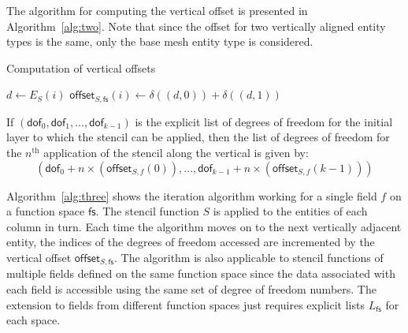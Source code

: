\documentclass[11pt, a4paper]{scrartcl}
\begin{document}
The algorithm for computing the vertical offset is presented in
Algorithm~\ref{alg:two}. Note that since the offset for two vertically
aligned entity types is the same, only the base mesh entity type is
considered.
\begin{algorithm}[th]
\caption{Computation of vertical offsets}
\label{alg:two}
\begin{algorithmic}

	\STATE $d \leftarrow E_{S}(i)$
	\STATE $\mathsf{offset}_{S, \mathsf{fs}}(i) \leftarrow \delta((d, 0)) + \delta((d, 1))$
\ENDFOR
\end{algorithmic}
\end{algorithm}

If $(\mathsf{dof}_{0}, \mathsf{dof}_{1}, ... , \mathsf{dof}_{k-1})$ is
the explicit list of degrees of freedom for the initial layer to which
the stencil can be applied, then the list of degrees of freedom for
the $n^\mathrm{th}$ application of the stencil along the vertical is
given by:
\begin{equation}
(\mathsf{dof}_{0} + n \times (\mathsf{offset}_{S, f}(0)) , ... , \mathsf{dof}_{k-1} + n \times (\mathsf{offset}_{S, f}(k-1)))
\end{equation}

Algorithm~\ref{alg:three} shows the iteration algorithm working for a
single field $f$ on a function space $\mathsf{fs}$. The stencil
function $S$ is applied to the entities of each column in turn. Each
time the algorithm moves on to the next vertically adjacent entity,
the indices of the degrees of freedom accessed are incremented by the
vertical offset $\mathsf{offset}_{S, \mathsf{fs}}$. The algorithm is
also applicable to stencil functions of multiple fields defined on the
same function space since the data associated with each field is
accessible using the same set of degree of freedom numbers.  The
extension to fields from different function spaces just requires
explicit lists $L_{\mathsf{fs}}$ for each space.
\end{document}
